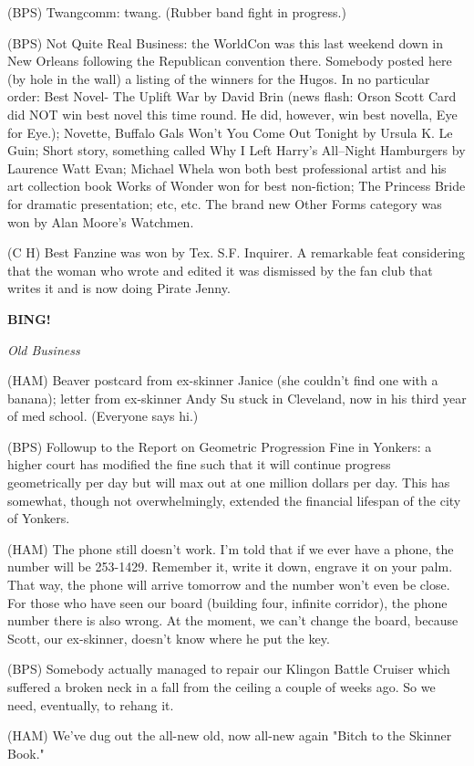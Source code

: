 \documentclass[12pt]{article}
\newcommand{\bing}{{\bf BING!} }
\newcommand{\goto}[1]{\bing \vskip 12pt \centerline{{\em{#1}}}}
\begin{document}
(BPS) Twangcomm: twang. (Rubber band fight in progress.)

(BPS) Not Quite Real Business: the WorldCon was this last weekend down in New Orleans following the Republican convention there. Somebody posted here (by hole in the wall) a listing of the winners for the Hugos. In no particular order: Best Novel- The Uplift War by David Brin (news flash: Orson Scott Card did NOT win best novel this time round. He did, however, win best novella, Eye for Eye.); Novette, Buffalo Gals Won't You Come Out Tonight by Ursula K. Le Guin; Short story, something called Why I Left Harry's All--Night Hamburgers by Laurence Watt Evan; Michael Whela won both best professional artist and his art collection book Works of Wonder won for best non-fiction; The Princess Bride for dramatic presentation; etc, etc. The brand new Other Forms category was won by Alan Moore's Watchmen.

(C H) Best Fanzine was won by Tex. S.F. Inquirer. A remarkable feat considering that the woman who wrote and edited it was dismissed by the fan club that writes it and is now doing Pirate Jenny.

\goto{Old Business}

(HAM) Beaver postcard from ex-skinner Janice (she couldn't find one with a banana); letter from ex-skinner Andy Su stuck in Cleveland, now in his third year of med school. (Everyone says hi.)

(BPS) Followup to the Report on Geometric Progression Fine in Yonkers: a higher court has modified the fine such that it will continue progress geometrically per day but will max out at one million dollars per day. This has somewhat, though not overwhelmingly, extended the financial lifespan of the city of Yonkers.

(HAM) The phone still doesn't work. I'm told that if we ever have a phone, the number will be 253-1429. Remember it, write it down, engrave it on your palm. That way, the phone will arrive tomorrow and the number won't even be close. For those who have seen our board (building four, infinite corridor), the phone number there is also wrong. At the moment, we can't change the board, because Scott, our ex-skinner, doesn't know where he put the key.

(BPS) Somebody actually managed to repair our Klingon Battle Cruiser which suffered a broken neck in a fall from the ceiling a couple of weeks ago. So we need, eventually, to rehang it.

(HAM) We've dug out the all-new old, now all-new again "Bitch to the Skinner Book."
\end{document}
